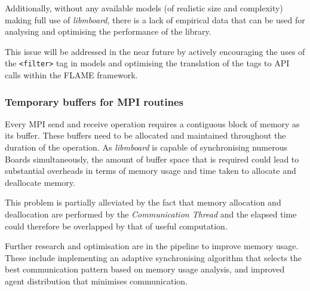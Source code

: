 Additionally, without any available models (of realistic size and complexity) making full use of \textit{libmboard}, there is a lack of empirical data that can be used for analysing and optimising the performance of the library. 

This issue will be addressed in the near future by actively encouraging the uses of the \texttt{<filter>} tag in models and optimising the translation of the tags to API calls within the FLAME framework.


\subsubsection{Temporary buffers for MPI routines}

Every MPI send and receive operation requires a contiguous block of memory as its buffer. These buffers need to be allocated and maintained throughout the duration of the operation. As \textit{libmboard} is capable of synchronising numerous Boards simultaneously, the amount of buffer space that is required could lead to substantial overheads in terms of memory usage and time taken to allocate and deallocate memory. 

This problem is partially alleviated by the fact that memory allocation and deallocation are performed by the \textit{Communication Thread} and the elapsed time could therefore be overlapped by that of useful computation.

Further research and optimisation are in the pipeline to improve memory usage. These include implementing an adaptive synchronising algorithm that selects the best communication pattern based on memory usage analysis, and improved agent distribution that minimises communication.


